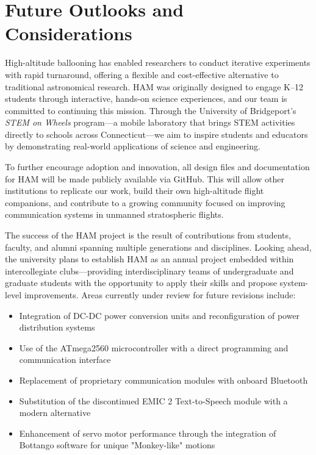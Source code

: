 \vspace{-2em}
\section{Future Outlooks and Considerations}
\vspace{-2em}

High-altitude ballooning has enabled researchers to conduct iterative experiments with rapid turnaround, offering a flexible and cost-effective alternative to traditional astronomical research. HAM was originally designed to engage K–12 students through interactive, hands-on science experiences, and our team is committed to continuing this mission. Through the University of Bridgeport's \textit{STEM on Wheels} program—a mobile laboratory that brings STEM activities directly to schools across Connecticut—we aim to inspire students and educators by demonstrating real-world applications of science and engineering.

To further encourage adoption and innovation, all design files and documentation for HAM will be made publicly available via GitHub. This will allow other institutions to replicate our work, build their own high-altitude flight companions, and contribute to a growing community focused on improving communication systems in unmanned stratospheric flights.

The success of the HAM project is the result of contributions from students, faculty, and alumni spanning multiple generations and disciplines. Looking ahead, the university plans to establish HAM as an annual project embedded within intercollegiate clubs—providing interdisciplinary teams of undergraduate and graduate students with the opportunity to apply their skills and propose system-level improvements. Areas currently under review for future revisions include:

\vspace{-2em}
\begin{itemize}
    \item Integration of DC-DC power conversion units and reconfiguration of power distribution systems
    \item Use of the ATmega2560 microcontroller with a direct programming and communication interface
    \item Replacement of proprietary communication modules with onboard Bluetooth
    \item Substitution of the discontinued EMIC 2 Text-to-Speech module with a modern alternative
    \item Enhancement of servo motor performance through the integration of Bottango software for unique "Monkey-like" motions \cite{Bottango}
\end{itemize}
\vspace{-2em}

